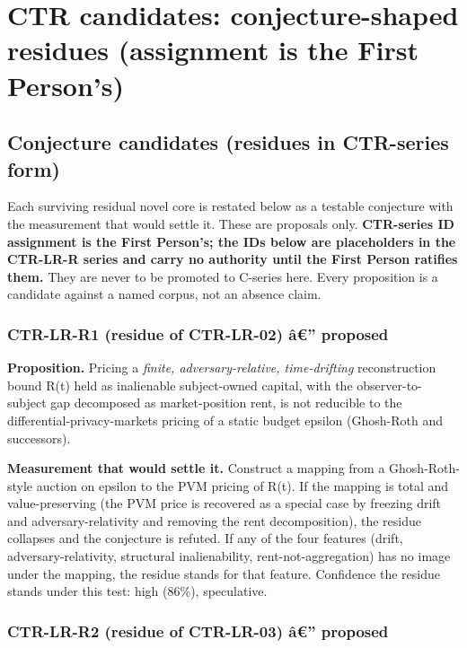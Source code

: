 \documentclass[
  11pt,
]{article}
\begin{document}
\section{CTR candidates: conjecture-shaped residues (assignment is the
First
Person's)}\label{ctr-candidates-conjecture-shaped-residues-assignment-is-the-first-persons}

\subsection{Conjecture candidates (residues in CTR-series
form)}\label{conjecture-candidates-residues-in-ctr-series-form}

Each surviving residual novel core is restated below as a testable
conjecture with the measurement that would settle it. These are
proposals only. \textbf{CTR-series ID assignment is the First Person's;
the IDs below are placeholders in the CTR-LR-R series and carry no
authority until the First Person ratifies them.} They are never to be
promoted to C-series here. Every proposition is a candidate against a
named corpus, not an absence claim.

\subsubsection{CTR-LR-R1 (residue of CTR-LR-02) â€''
proposed}\label{ctr-lr-r1-residue-of-ctr-lr-02-uxe2-proposed}

\textbf{Proposition.} Pricing a \emph{finite, adversary-relative,
time-drifting} reconstruction bound R(t) held as inalienable
subject-owned capital, with the observer-to-subject gap decomposed as
market-position rent, is not reducible to the
differential-privacy-markets pricing of a static budget epsilon
(Ghosh-Roth and successors).

\textbf{Measurement that would settle it.} Construct a mapping from a
Ghosh-Roth-style auction on epsilon to the PVM pricing of R(t). If the
mapping is total and value-preserving (the PVM price is recovered as a
special case by freezing drift and adversary-relativity and removing the
rent decomposition), the residue collapses and the conjecture is
refuted. If any of the four features (drift, adversary-relativity,
structural inalienability, rent-not-aggregation) has no image under the
mapping, the residue stands for that feature. Confidence the residue
stands under this test: high (86\%), speculative.

\subsubsection{CTR-LR-R2 (residue of CTR-LR-03) â€''
proposed}\label{ctr-lr-r2-residue-of-ctr-lr-03-uxe2-proposed}
\end{document}
